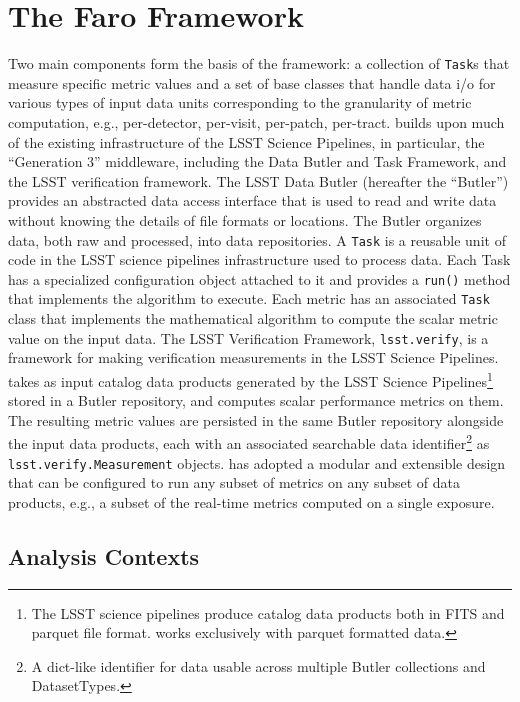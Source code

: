 \section{The Faro Framework} \label{sec:faro}

Two main components form the basis of the \faro framework: a collection of \texttt{Task}s that measure specific metric values and a set of base classes that handle data i/o for various types of input data units corresponding to the granularity of metric computation, e.g., per-detector, per-visit, per-patch, per-tract.
\faro builds upon much of the existing infrastructure of the LSST Science Pipelines, in particular, the ``Generation 3'' middleware, including the Data Butler and Task Framework\cite{SPIE-12189-40}, and the LSST verification framework\cite{SQR-019}.
The LSST Data Butler (hereafter the ``Butler'') provides an abstracted data access interface that is used to read and write data without knowing the details of file formats or locations.
The Butler organizes data, both raw and processed, into data repositories.
A \texttt{Task} is a reusable unit of code in the LSST science pipelines infrastructure used to process data.
Each Task has a specialized configuration object attached to it and provides a \texttt{run()} method that implements the algorithm to execute. 
Each \faro metric has an associated \texttt{Task} class that implements the mathematical algorithm to compute the scalar metric value on the input data.
The LSST Verification Framework, \texttt{lsst.verify}, is a framework for making verification measurements in the LSST Science Pipelines.
\faro takes as input catalog data products generated by the LSST Science Pipelines\footnote{The LSST science pipelines produce catalog data products both in FITS and parquet file format. \faro works exclusively with parquet formatted data.} stored in a Butler repository,
 and computes scalar performance metrics on them. 
The resulting metric values are persisted in the same Butler repository alongside the input data products, each with an associated searchable data identifier\footnote{A dict-like identifier for data usable across multiple Butler collections and DatasetTypes.} as \texttt{lsst.verify.Measurement} objects.
\faro has adopted a modular and extensible design that can be configured to run any subset of metrics on any subset of data products, e.g., a subset of the real-time metrics computed on a single exposure.

\subsection{Analysis Contexts} \label{ssec:analysis_context}

